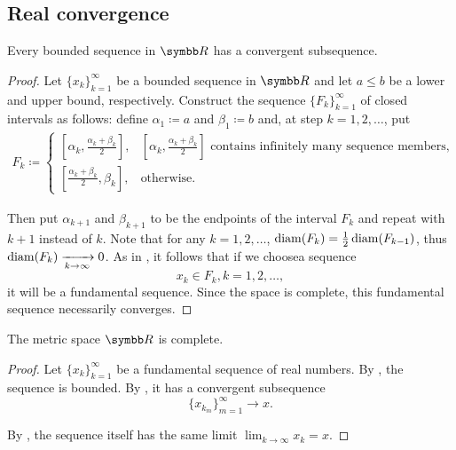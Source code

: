 \subsection{Real convergence}\label{subsec:real_vector_space_convergence}

\begin{theorem}\label{def:bolzano_weierstrass}
  Every bounded sequence in \( \BR \) has a convergent subsequence.
\end{theorem}
\begin{proof}
  Let \( \{ x_k \}_{k=1}^\infty \) be a bounded sequence in \( \BR \) and let \( a \leq b \) be a lower and upper bound, respectively. Construct the sequence \( \{ F_k \}_{k=1}^\infty \) of closed intervals as follows: define \( \alpha_1 \coloneqq a \) and \( \beta_1 \coloneqq b \) and, at step \( k = 1, 2, \ldots \), put
  \begin{align*}
    F_k \coloneqq \begin{cases}
      [\alpha_k, \tfrac{\alpha_k+\beta_k} 2], &[\alpha_k, \tfrac{\alpha_k+\beta_k} 2]\text{ contains infinitely many sequence members}, \\
      [\tfrac{\alpha_k+\beta_k} 2, \beta_k], &\text{otherwise}.
    \end{cases}
  \end{align*}

  Then put \( \alpha_{k+1} \) and \( \beta_{k+1} \) to be the endpoints of the interval \( F_k \) and repeat with \( k+1 \) instead of \( k \). Note that for any \( k = 1, 2, \ldots \), \( \operatorname{diam}(F_k) = \tfrac 1 2 \operatorname{diam}(F_{k-1}) \), thus \( \operatorname{diam}(F_k) \xrightarrow[k \to \infty]{} 0 \). As in , it follows that if we choose\AOC a sequence
  \begin{equation*}
    x_k \in F_k, k = 1, 2, \ldots,
  \end{equation*}
  it will be a fundamental sequence. Since the space is complete, this fundamental sequence necessarily converges.
\end{proof}

\begin{theorem}\label{def:real_numbers_complete_metric_space}
  The metric space \( \BR \) is complete.
\end{theorem}
\begin{proof}
  Let \( \{ x_k \}_{k=1}^\infty \) be a fundamental sequence of real numbers. By , the sequence is bounded. By , it has a convergent subsequence
  \begin{equation*}
    \{ x_{k_m} \}_{m=1}^\infty \to x.
  \end{equation*}

  By , the sequence itself has the same limit \( \lim_{k \to \infty} x_k = x \).
\end{proof}

